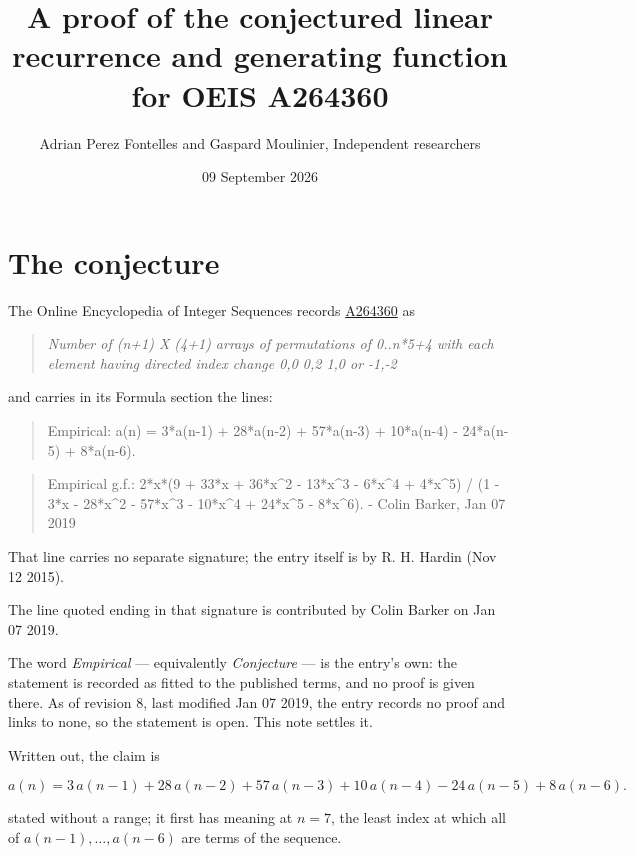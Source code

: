 \documentclass[11pt]{article}
\title{A proof of the conjectured linear recurrence and generating function for OEIS A264360}
\author{Adrian Perez Fontelles and Gaspard Moulinier, Independent researchers}
\date{09 September 2026}
\theoremstyle{definition}
\begin{document}
\maketitle
\section{The conjecture}

The Online Encyclopedia of Integer Sequences records \href{https://oeis.org/A264360}{A264360} as

\begin{quote}\itshape Number of (n+1) X (4+1) arrays of permutations of 0..n*5+4 with each element having directed index change 0,0 0,2 1,0 or -1,-2\end{quote}

and carries in its Formula section the lines:

\begin{quote}\ttfamily Empirical: a(n) = 3*a(n-1) + 28*a(n-2) + 57*a(n-3) + 10*a(n-4) - 24*a(n-5) + 8*a(n-6).\end{quote}

\begin{quote}\ttfamily Empirical g.f.: 2*x*(9 + 33*x + 36*x\textasciicircum{}2 - 13*x\textasciicircum{}3 - 6*x\textasciicircum{}4 + 4*x\textasciicircum{}5) / (1 - 3*x - 28*x\textasciicircum{}2 - 57*x\textasciicircum{}3 - 10*x\textasciicircum{}4 + 24*x\textasciicircum{}5 - 8*x\textasciicircum{}6). - Colin Barker, Jan 07 2019\end{quote}

That line carries no separate signature; the entry itself is by R. H. Hardin (Nov 12 2015).

The line quoted ending in that signature is contributed by Colin Barker on Jan 07 2019.

The word {\itshape Empirical} --- equivalently {\itshape Conjecture} --- is the entry's own: the statement is recorded as fitted to the published terms, and no proof is given there. As of revision 8, last modified Jan 07 2019, the entry records no proof and links to none, so the statement is open. This note settles it.

Written out, the claim is

\[a(n) = 3\,a(n-1) + 28\,a(n-2) + 57\,a(n-3) + 10\,a(n-4) - 24\,a(n-5) + 8\,a(n-6).\]

stated without a range; it first has meaning at $n = 7$, the least index at which all of $a(n-1),\dots,a(n-6)$ are terms of the sequence.
\end{document}
